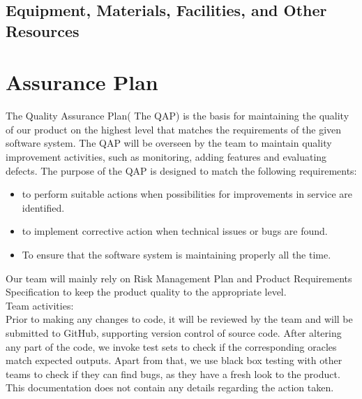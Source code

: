 \documentclass{l3deliverable}
\begin{document}
{\subsection{Equipment, Materials, Facilities, and Other Resources}


\section{Assurance Plan}


The Quality Assurance Plan( The QAP) is the basis for maintaining the quality of our product on the highest level that matches the requirements of the given software system. The QAP will be overseen by the team to maintain quality improvement activities, such as monitoring, adding features and evaluating defects. The purpose of the QAP is designed to match the following requirements:\\

\begin{itemize}
\item to perform suitable actions when possibilities for improvements in service are identified.\\
\item to implement corrective action when technical issues or bugs are found.\\
\item To ensure that the software system is maintaining properly all the time.\\
\end{itemize}

Our team will mainly rely on Risk Management Plan and Product Requirements Specification to keep the product quality to the appropriate level.\\

Team activities:\\

Prior to making any changes to code, it will be reviewed by the team and will be submitted to GitHub, supporting version control of source code. After altering any part of the code, we invoke test sets to check if the corresponding oracles match expected outputs. Apart from that, we use black box testing with other teams to check if they can find bugs, as they have a fresh look to the product.\\

This documentation does not contain any details regarding the action taken.\\


}
\end{document}
